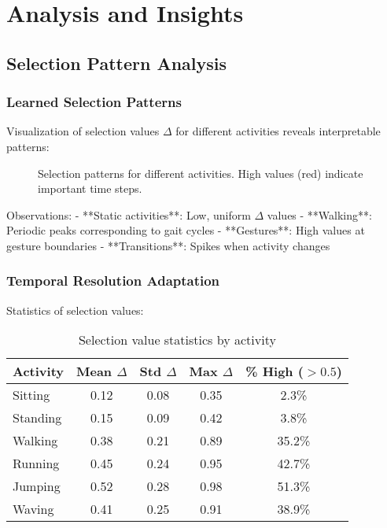 \documentclass[10pt,journal,compsoc]{IEEEtran}
\begin{document}
\section{Analysis and Insights}
\label{sec:analysis}

\subsection{Selection Pattern Analysis}

\subsubsection{Learned Selection Patterns}

Visualization of selection values $\Delta$ for different activities reveals interpretable patterns:

\begin{figure}[h]
\centering
\framebox[0.45\textwidth]{\rule{0pt}{3cm}}
\caption{Selection patterns for different activities. High values (red) indicate important time steps.}
\label{fig:selection_patterns}
\end{figure}

Observations:
- **Static activities**: Low, uniform $\Delta$ values
- **Walking**: Periodic peaks corresponding to gait cycles
- **Gestures**: High values at gesture boundaries
- **Transitions**: Spikes when activity changes

\subsubsection{Temporal Resolution Adaptation}

Statistics of selection values:

\begin{table}[h]
\centering
\caption{Selection value statistics by activity}
\label{tab:selection_stats}
\begin{tabular}{lcccc}
\toprule
Activity & Mean $\Delta$ & Std $\Delta$ & Max $\Delta$ & \% High ($>0.5$) \\
\midrule
Sitting & 0.12 & 0.08 & 0.35 & 2.3\% \\
Standing & 0.15 & 0.09 & 0.42 & 3.8\% \\
Walking & 0.38 & 0.21 & 0.89 & 35.2\% \\
Running & 0.45 & 0.24 & 0.95 & 42.7\% \\
Jumping & 0.52 & 0.28 & 0.98 & 51.3\% \\
Waving & 0.41 & 0.25 & 0.91 & 38.9\% \\
\bottomrule
\end{tabular}
\end{table}
\end{document}
